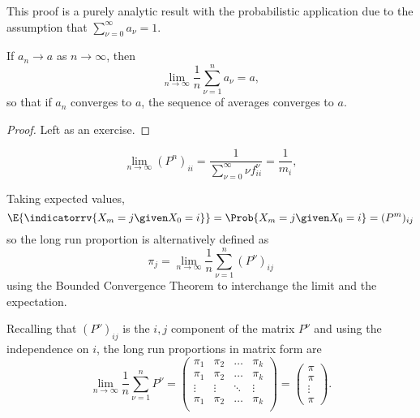 \documentclass[12pt]{article}
\begin{document}
\begin{remark}
    This proof is a purely analytic result with the probabilistic
    application due to the assumption that \( \sum_{\nu=0}^{\infty} a_\nu
    = 1 \).
\end{remark}

\begin{lemma}
    If \( a_n \to a \) as \( n \to \infty \), then
    \[
        \lim_{n \to \infty} \frac{1}{n} \sum\limits_{\nu=1}^{n} a_{\nu}
        = a,
    \] so that if \( a_n \) converges to \( a \), the sequence of
    averages converges to \( a \).
\end{lemma}

\begin{proof}
    Left as an exercise.
\end{proof}

\begin{corollary}
    \[
        \lim_{n \to \infty} (P^{n})_{ii} = \frac{1}{\sum\limits_{\nu=0}^
        {\infty} \nu f^{\nu}_{ii}} = \frac{1}{m_i},
    \]
\end{corollary}

\begin{remark}
    Taking expected values,
    \[
        \E{\indicatorrv{X_m = j \given X_0 = i}} = \Prob{X_m = j \given
        X_0 = i} = (P^m)_{ij}
    \] so the long run proportion is alternatively defined as
    \[
        \pi_j = \lim_{n \to \infty} \frac{1}{n} \sum\limits_{\nu=1}^n (P^
        {\nu})_ {ij}
    \] using the Bounded Convergence Theorem to interchange the limit
    and the expectation.
\end{remark}

\begin{remark}
    Recalling that \( (P^{\nu})_{ij} \) is the \( i,j \) component of
    the matrix \( P^{\nu} \) and using the independence on \( i \), the
    long run proportions in matrix form are
    \[
        \lim_{n \to \infty} \frac{1}{n} \sum\limits_{\nu=1}^n P^{\nu} =
        \begin{pmatrix}
            \pi_1 & \pi_2 & \ldots & \pi_k \\
            \pi_1 & \pi_2 & \ldots & \pi_k \\
            \vdots & \vdots & \ddots & \vdots \\
            \pi_1 & \pi_2 & \ldots & \pi_k \\
        \end{pmatrix}
        =
        \begin{pmatrix}
            \pi \\
            \pi \\
            \vdots \\
            \pi
        \end{pmatrix}
        .
    \]
\end{remark}
\end{document}
